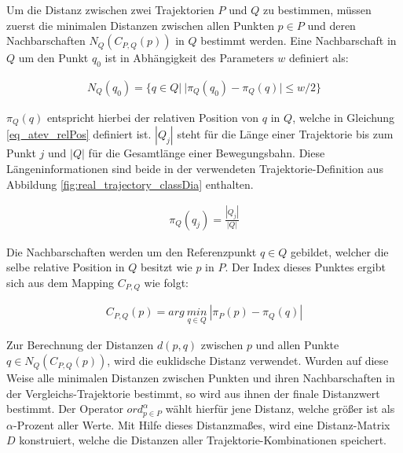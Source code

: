 Um die Distanz zwischen zwei Trajektorien $P$ und $Q$ zu bestimmen, müssen zuerst die minimalen Distanzen
zwischen allen Punkten $p \in P$ und deren Nachbarschaften $N_Q(C_{P,Q}(p))$ in $Q$ bestimmt werden.
Eine Nachbarschaft in $Q$ um den Punkt $q_0$ ist in Abhängigkeit des Parameters $w$ definiert als:

\begin{ceqn}
\begin{align}
    N_Q(q_0) = \{ q \in Q |\ |\pi_Q(q_0) - \pi_Q(q)| \le w/2 \}
\end{align}
\end{ceqn}

$\pi_Q(q)$ entspricht hierbei der relativen Position von $q$ in $Q$, welche in Gleichung \ref{eq_atev_relPos} definiert ist.
$|Q_j|$ steht für die Länge einer Trajektorie bis zum Punkt $j$ und $|Q|$ für die Gesamtlänge einer Bewegungsbahn.
Diese Längeninformationen sind beide in der verwendeten Trajektorie-Definition aus Abbildung
\ref{fig:real_trajectory_classDia} enthalten.

\begin{ceqn}
\begin{align}
\label{eq_atev_relPos}
    \pi_Q(q_j) = \frac{|Q_j|}{|Q|}
\end{align}
\end{ceqn}

Die Nachbarschaften werden um den Referenzpunkt $q \in Q$ gebildet, welcher die selbe relative Position
in $Q$ besitzt wie $p$ in $P$. Der Index dieses Punktes ergibt sich aus dem Mapping $C_{P,Q}$ wie folgt:

\begin{ceqn}
\begin{align}
\label{eq_atev_findPointAtRelPow}
    C_{P,Q}(p) = arg\ \underset{q \in Q}{min}\ |\pi_P(p) - \pi_Q(q)|
\end{align}
\end{ceqn}

Zur Berechnung der Distanzen $d(p,q)$ zwischen $p$ und allen Punkte $q \in N_Q(C_{P,Q}(p))$, wird die euklidsche
Distanz verwendet. Wurden auf diese Weise alle minimalen Distanzen zwischen Punkten und ihren Nachbarschaften in
der Vergleichs-Trajektorie bestimmt, so wird aus ihnen der finale Distanzwert bestimmt. Der Operator
$ord_{p \in P}^{\alpha}$ wählt hierfür jene Distanz, welche größer ist als $\alpha$-Prozent aller Werte.
Mit Hilfe dieses Distanzmaßes, wird eine Distanz-Matrix $D$ konstruiert, welche die Distanzen
aller Trajektorie-Kombinationen speichert.

